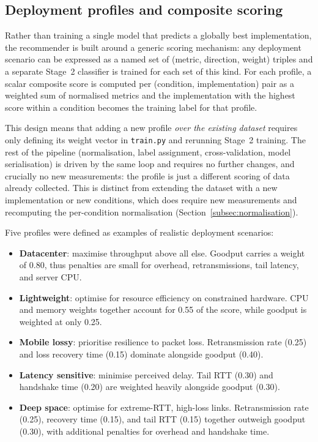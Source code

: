 \subsection{Deployment profiles and composite scoring}
\label{subsec:profiles}

Rather than training a single model that predicts a globally best
implementation, the recommender is built around a generic scoring mechanism:
any deployment scenario can be expressed as a named set of (metric, direction,
weight) triples and a separate Stage~2 classifier is trained for each set
of this kind. For each profile, a scalar composite score is computed per
(condition, implementation) pair as a weighted sum of normalised metrics and
the implementation with the highest score within a condition becomes the
training label for that profile.

This design means that adding a new profile \emph{over the existing dataset}
requires only defining its weight vector in \texttt{train.py} and rerunning
Stage~2 training. The rest of the pipeline (normalisation, label assignment,
cross-validation, model serialisation) is driven by the same loop and requires
no further changes, and crucially no new measurements: the profile is just a
different scoring of data already collected. This is distinct from extending the
dataset with a new implementation or new conditions, which does require new
measurements and recomputing the per-condition normalisation
(Section~\ref{subsec:normalisation}).

Five profiles were defined as examples of realistic deployment scenarios:

\begin{itemize}
    \item \textbf{Datacenter}: maximise throughput above all else.
          Goodput carries a weight of 0.80, thus penalties are small for
          overhead, retransmissions, tail latency, and server CPU.
    \item \textbf{Lightweight}: optimise for resource efficiency on
          constrained hardware. CPU and memory weights together account for
          0.55 of the score, while goodput is weighted at only 0.25.
    \item \textbf{Mobile lossy}: prioritise resilience to packet loss.
          Retransmission rate (0.25) and loss recovery time (0.15) dominate
          alongside goodput (0.40).
    \item \textbf{Latency sensitive}: minimise perceived delay. Tail RTT
          (0.30) and handshake time (0.20) are weighted heavily alongside
          goodput (0.30).
    \item \textbf{Deep space}: optimise for extreme-RTT, high-loss links.
          Retransmission rate (0.25), recovery time (0.15), and tail RTT (0.15)
          together outweigh goodput (0.30), with additional penalties for
          overhead and handshake time.
\end{itemize}

